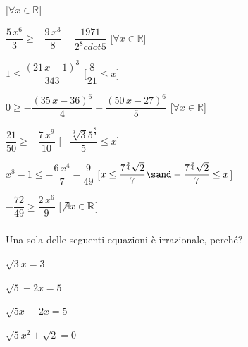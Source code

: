 \begin{esercizio}
\begin{enumeratea}
\hfill [\(\forall x \in \mathbb{R}\)]
\item \({\dfrac{5\,{x}^{6}}{3}}\geq -{\dfrac{9\,{x}^{3}}{8}}-{\dfrac
{1971}{2^8  cdot 5}}\) 
\hfill [\(\forall x \in \mathbb{R}\)]
\item \(1\leq {\dfrac{ \left( 21\,x-1 \right) ^{3}}{343}}\) 
\hfill [\({\dfrac{8}{21}}\leq x\)]
\item \(0\geq -{\dfrac{ \left( 35\,x-36 \right) ^{6}}{4}}-{\dfrac{ 
\left( 50\,x-27 \right) ^{6}}{5}}\) 
\hfill [\(\forall x \in \mathbb{R}\)]
\item \({\dfrac{21}{50}}\geq -{\dfrac{7\,{x}^{9}}{10}}\) 
\hfill [\(-{\dfrac{\sqrt [9]{3}{5}^{{\frac{8}{9}}}}{5}}\leq x\)]
\item \({x}^{8}-1\leq -{\dfrac{6\,{x}^{4}}{7}}-{\dfrac{9}{49}}\) 
\hfill [\(x\leq {\dfrac{{7}^{{\frac{3}{4}}}\sqrt {2}}{7}} \sand -{\dfrac
{{7}^{{\frac{3}{4}}}\sqrt {2}}{7}}\leq x\)]
\item \(-{\dfrac{72}{49}}\geq {\dfrac{2\,{x}^{6}}{9}}\) 
\hfill [\(\not\exists x \in \mathbb{R}\)]
\end{enumeratea}
\end{esercizio}

\subsubsection*{}

\begin{esercizio}\label{ese:03.1}
Una sola delle seguenti equazioni è irrazionale, perché?
\begin{multicols}{4}
\begin{enumeratea}
\item \(\sqrt{3} x = 3\)
\item \(\sqrt{5} -2x = 5\)
\item \(\sqrt{5x} -2x = 5\)
\item \(\sqrt{5}x^2 +\sqrt{2} = 0\)
\end{enumeratea}
\end{multicols}
\end{esercizio}

